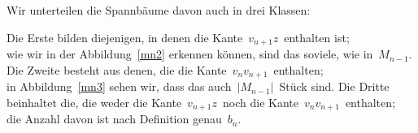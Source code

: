 Wir unterteilen die Spannbäume davon auch in drei Klassen:\\
\par
\begingroup
\leftskip=20pt
\rightskip=20pt
\noindent
Die Erste bilden diejenigen, in denen die Kante $\,v_{n+1}z\,$ enthalten ist;\\
wie wir in der Abbildung~\ref{mn2} erkennen können, sind das soviele, wie in $\,M_{n-1}$.\; 
\vfill
Die Zweite besteht aus denen, die die Kante $\,v_nv_{n+1}\,$ enthalten;\\
in Abbildung~\ref{mn3} sehen wir, dass das auch $\,|M_{n-1}|\,$ Stück sind.
\vfill
Die Dritte beinhaltet die, die weder die Kante $\,v_{n+1}z\,$ noch die Kante $\,v_nv_{n+1}\,$ enthalten;\\ die Anzahl davon ist nach Definition genau $\,b_{n}$.\; 
\par
\endgroup
